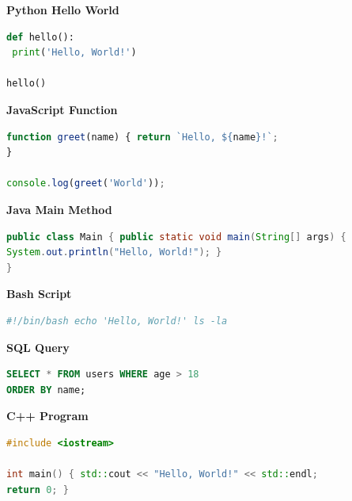\textbf{Python Hello World}

\begin{lstlisting}[language=Python]
def hello():
 print('Hello, World!')

hello()
\end{lstlisting}

\vspace{1em}

\textbf{JavaScript Function}

\begin{lstlisting}[language=JavaScript]
function greet(name) { return `Hello, ${name}!`;
}

console.log(greet('World'));
\end{lstlisting}

\vspace{1em}

\textbf{Java Main Method}

\begin{lstlisting}[language=Java]
public class Main { public static void main(String[] args) {
System.out.println("Hello, World!"); }
}
\end{lstlisting}

\vspace{1em}

\textbf{Bash Script}

\begin{lstlisting}[language=bash]
#!/bin/bash echo 'Hello, World!' ls -la
\end{lstlisting}

\vspace{1em}

\textbf{SQL Query}

\begin{lstlisting}[language=SQL]
SELECT * FROM users WHERE age > 18
ORDER BY name;
\end{lstlisting}

\vspace{1em}

\textbf{C++ Program}

\begin{lstlisting}[language=C++]
#include <iostream>

int main() { std::cout << "Hello, World!" << std::endl;
return 0; }
\end{lstlisting}
